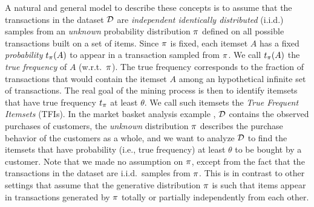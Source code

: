 A natural and general model to describe these concepts %
is to assume that the transactions in the dataset ${\cal D}$ are \emph{independent
identically distributed} (i.i.d.) samples from an \emph{unknown} probability
distribution $\pi$ defined on all possible transactions built on a set of
items. %
Since $\pi$ is fixed, each itemset $A$ has a fixed \emph{probability} $t_\pi(A)$
to appear in a transaction sampled from $\pi$. We call $t_\pi(A)$ the
\emph{true frequency} of $A$ (w.r.t.~$\pi$). The true frequency corresponds
to the fraction of transactions that would contain the itemset $A$ among an
hypothetical infinite
set %
of transactions. %
The real goal of the mining process is then to identify itemsets that have
true frequency $t_\pi$ at least $\theta$. We call such itemsets the \emph{True Frequent
Itemsets} (TFIs). %
In the market basket analysis example%
, ${\cal D}$ contains %
the observed purchases of customers, the \emph{unknown} distribution $\pi$
describes the purchase behavior of the customers as a whole, and we want to
analyze ${\cal D}$ to find the itemsets that have probability (i.e., true frequency) %
at least $\theta$ to be bought by a customer. Note that we made no assumption on
$\pi$, except from the fact that the transactions in the dataset are
i.i.d.~samples from $\pi$. This is in contrast to other settings that assume
that the generative distribution $\pi$ is such that items appear in
transactions generated by $\pi$ totally or partially independently from each
other.

